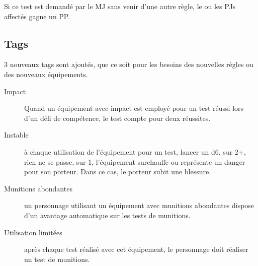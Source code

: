 \documentclass[10pt,a4paper]{article}
\begin{document}
Si ce test est demandé par le MJ sans venir d'une autre règle, le ou les PJs affectés gagne un PP.
\subsection{Tags}
3 nouveaux tags sont ajoutés, que ce soit pour les besoins des nouvelles règles ou des nouveaux équipements.
\begin{description}
\item[Impact]Quand un équipement avec impact est employé pour un test réussi lors d'un défi de compétence, le test compte pour deux réussites.
\item[Instable] à chaque utilisation de l'équipement pour un test, lancer un d6, sur 2+, rien ne se passe, sur 1, l'équipement surchauffe ou représente un danger pour son porteur. Dans ce cas, le porteur subit une blessure.
\item[Munitions abondantes]un personnage utilisant un équipement avec munitions abondantes dispose d'un avantage automatique sur les tests de munitions.
\item[Utilisation limitées]après chaque test réalisé avec cet équipement, le personnage doit réaliser un test de munitions.
\end{description}
\end{document}
